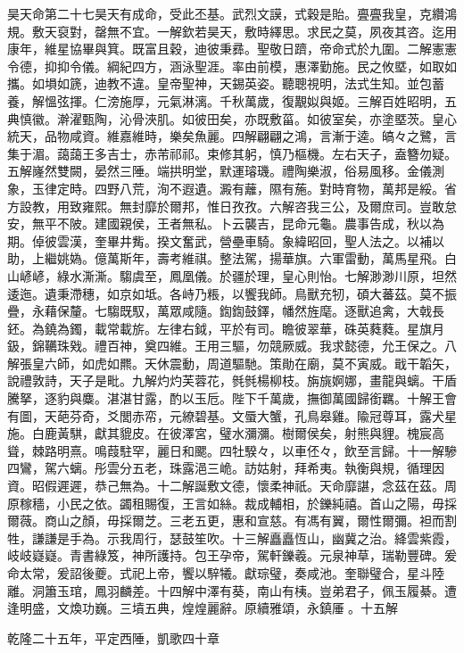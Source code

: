 \begin{pinyinscope}
昊天命第二十七昊天有成命，受此丕基。武烈文謨，式穀是貽。亹亹我皇，克纘鴻規。敷天裒對，罄無不宜。一解欽若昊天，敷時繹思。求民之莫，夙夜其咨。迄用康年，維星協畢與箕。既富且穀，迪彼秉彞。聖敬日躋，帝命式於九圍。二解憲憲令德，抑抑令儀。綱紀四方，涵泳聖涯。率由前模，惠澤勤施。民之攸塈，如取如攜。如塤如篪，迪教不違。皇帝聖神，天錫英姿。聽聰視明，法式生知。並包蓄養，解慍弦揮。仁滂施厚，元氣淋漓。千秋萬歲，復覯姒與姬。三解百姓昭明，五典慎徽。澣濯甄陶，沁骨浹肌。如彼田矣，亦既敷菑。如彼室矣，亦塗塈茨。皇心統天，品物咸資。維嘉維時，樂矣魚麗。四解翩翩之鴻，言漸于逵。皜々之鷺，言集于湄。藹藹王多吉士，赤芾祁祁。束修其躬，慎乃樞機。左右天子，盍簪勿疑。五解嶐然雙闕，晏然三陲。端拱明堂，默運璿璣。禮陶樂淑，俗易風移。金儀測象，玉律定時。四野八荒，洵不遐遺。澱有蘺，隰有葹。對時育物，萬邦是綏。省方設教，用致雍熙。無封靡於爾邦，惟日孜孜。六解咨我三公，及爾庶司。豈敢怠安，無平不陂。建國親侯，王者無私。卜云襲吉，昆命元龜。農事告成，秋以為期。倬彼雲漢，奎畢井觜。揆文奮武，營壘車騎。象緯昭回，聖人法之。以補以助，上繼姚媯。億萬斯年，壽考維祺。整法駕，揚華旗。六軍雷動，萬馬星飛。白山嵃嵃，綠水澌澌。騶虞至，鳳凰儀。於疆於理，皇心則怡。七解渺渺川原，坦然逶迤。遺秉滯穗，如京如坻。各峙乃粻，以饗我師。鳥獸充牣，碩大蕃茲。莫不振疊，永藉保釐。七騶既馭，萬眾咸隨。鍧鍧鼓鐸，幡然旌麾。逐獸追禽，大戟長鉟。為鐃為鐲，載常載旂。左律右鉞，平於有司。瞻彼翠華，硃英蕤蕤。星旗月鈒，錦韉珠戣。禮百神，奠四維。王用三驅，勿競厥威。我求懿德，允王保之。八解張皇六師，如虎如羆。天休震動，周道驅馳。策勛在廟，莫不寅威。戢干韜矢，說禮敦詩，天子是毗。九解灼灼芙蓉花，毿毿楊柳枝。旃旐婀娜，畫龍與螭。干盾騰拏，逐豹與麋。湛湛甘露，酌以玉卮。陛下千萬歲，撫御萬國歸銜羈。十解王會有圖，天葩芬奇，爻閭赤帟，元繚碧基。文蜃大蟹，孔鳥皋雞。隃冠尊耳，露犬星施。白鹿黃騏，獻其貔皮。在彼澤宮，璧水瀰瀰。樹爾侯矣，射熊與貍。槐宸高聳，棘路明熹。鳴葭駐罕，麗日和颸。四牡騤々，以車伾々，飲至言歸。十一解驂四鸞，駕六螭。彤雲分五老，珠露浥三峗。訪姑射，拜希夷。執衡與規，循理因資。昭假遲遲，恭己無為。十二解誕敷文德，懷柔神祇。天命靡諶，念茲在茲。周原稼穡，小民之依。蠲租賜復，王言如絲。裁成輔相，於鑠純禧。首山之陽，毋採爾薇。商山之顏，毋採爾芝。三老五更，惠和宣慈。有馮有翼，爾性爾彌。袒而割牲，謙謙是手為。示我周行，瑟鼓笙吹。十三解矗矗恆山，幽冀之治。絳雲紫霞，岐岐嶷嶷。青書綠笈，神所護持。包王孕帝，駕軒鑠羲。元泉神草，瑞勒豐碑。爰命太常，爰詔後夔。式祀上帝，饗以騂犧。獻琮璧，奏咸池。奎聯璧合，星斗陸離。洞簫玉琯，鳳羽麟差。十四解中澤有葵，南山有桋。豈弟君子，佩玉履綦。遭逢明盛，文煥功巍。三墳五典，煌煌麗辭。原續雅頌，永鎮厜。十五解

乾隆二十五年，平定西陲，凱歌四十章


\end{pinyinscope}
